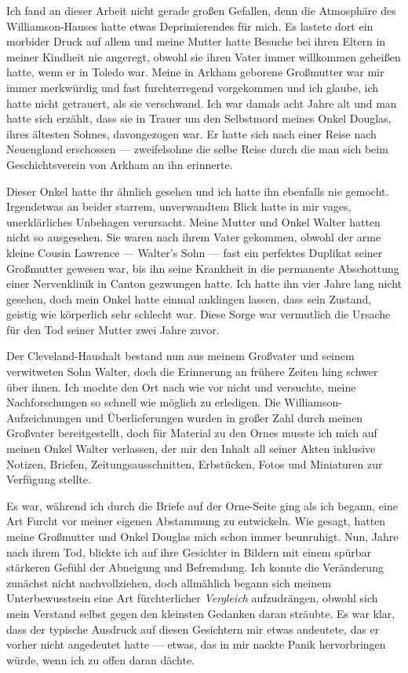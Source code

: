 Ich fand an dieser Arbeit nicht gerade großen Gefallen, denn die Atmosphäre des Williamson-Hauses hatte etwas Deprimierendes für mich. Es lastete dort ein morbider Druck auf allem und meine Mutter hatte Besuche bei ihren Eltern in meiner Kindheit nie angeregt, obwohl sie ihren Vater immer willkommen geheißen hatte, wenn er in Toledo war. Meine in Arkham geborene Großmutter war mir immer merkwürdig und fast furchterregend vorgekommen und ich glaube, ich hatte nicht getrauert, als sie verschwand. Ich war damals acht Jahre alt und man hatte sich erzählt, dass sie in Trauer um den Selbstmord meines Onkel Douglas, ihres ältesten Sohnes, davongezogen war. Er hatte sich nach einer Reise nach Neuengland erschossen --- zweifelsohne die selbe Reise durch die man sich beim Geschichtsverein von Arkham an ihn erinnerte.

Dieser Onkel hatte ihr ähnlich gesehen und ich hatte ihn ebenfalls nie gemocht. Irgendetwas an beider starrem, unverwandtem Blick hatte in mir vages, unerklärliches Unbehagen verursacht. Meine Mutter und Onkel Walter hatten nicht so ausgesehen. Sie waren nach ihrem Vater  gekommen, obwohl der arme kleine Cousin Lawrence --- Walter's Sohn --- fast ein perfektes Duplikat seiner Großmutter gewesen war, bis ihn seine Krankheit in die permanente Abschottung einer Nervenklinik in Canton gezwungen hatte. Ich hatte ihn vier Jahre lang nicht gesehen, doch mein Onkel hatte einmal anklingen lassen, dass sein Zustand, geistig wie körperlich sehr schlecht war. Diese Sorge war vermutlich die Ursache für den Tod seiner Mutter zwei Jahre zuvor.

Der Cleveland-Haushalt bestand nun aus meinem Großvater und seinem verwitweten Sohn Walter, doch die Erinnerung an frühere Zeiten hing schwer über ihnen. Ich mochte den Ort nach wie vor nicht und versuchte, meine Nachforschungen so schnell wie möglich zu erledigen. Die Williamson-\-Aufzeichnungen und Überlieferungen wurden in großer Zahl durch meinen Großvater bereitgestellt, doch für Material zu den Ornes musste ich mich auf meinen Onkel Walter verlassen, der mir den Inhalt all seiner Akten inklusive Notizen, Briefen, Zeitungsausschnitten, Erbstücken, Fotos und Miniaturen zur Verfügung stellte.

Es war, während ich durch die Briefe auf der Orne-Seite ging als ich begann, eine Art Furcht vor meiner eigenen Abstammung zu entwickeln. Wie gesagt, hatten meine Großmutter und Onkel Douglas mich schon immer beunruhigt. Nun, Jahre nach ihrem Tod, blickte ich auf ihre Gesichter in Bildern mit einem spürbar stärkeren Gefühl der Abneigung und Befremdung. Ich konnte die Veränderung zunächst nicht nachvollziehen, doch allmählich begann sich meinem  Unterbewusstsein eine Art fürchterlicher \textit{Vergleich}  aufzudrängen, obwohl sich mein Verstand selbst gegen den kleinsten Gedanken daran sträubte. Es war klar, dass der typische Ausdruck auf diesen Gesichtern mir etwas andeutete, das er vorher nicht angedeutet hatte --- etwas, das in mir nackte Panik hervorbringen würde, wenn ich zu offen daran dächte.

